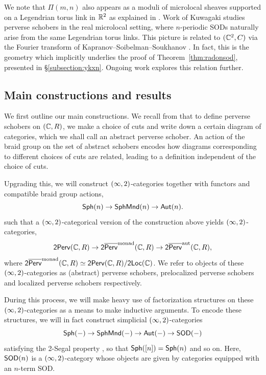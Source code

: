 We note that $\Pi(m,n)$ also appears as a moduli of microlocal sheaves supported on a Legendrian torus link in $\mathbb{R}^2$ as explained in \cite{shendeClusterVarietiesLegendrian2019}. Work of Kuwagaki \cite{kuwagakiCategorificationLegendrianKnots2019} studies perverse schobers in the real microlocal setting, where $n$-periodic SODs naturally arise from the same Legendrian torus links. This picture is related to $(\mathbb{C}^2,C)$ via the Fourier transform of Kapranov--Soibelman--Soukhanov \cite{kapranovPerverseSchobersAlgebra2020}. In fact, this is the geometry which implicitly underlies the proof of Theorem~\ref{thm:radonsod}, presented in \S\ref{subsection:ykxn}. Ongoing work explores this relation further.

\subsection{Main constructions and results}
We first outline our main constructions. We recall from \cite{kapranovPerverseSchobers2015} that to define perverse schobers on $(\mathbb{C},R)$, we make a choice of cuts and write down a certain diagram of categories, which we shall call an abstract perverse schober. An action of the braid group on the set of abstract schobers encodes how diagrams corresponding to different choices of cuts are related, leading to a definition independent of the choice of cuts.

Upgrading this, we will construct $(\infty,2)$-categories together with functors and compatible braid group actions,
\[\mathsf{Sph}(n)\to\mathsf{SphMnd}(n)\to\mathsf{Aut}(n).\]
such that a $(\infty,2)$-categorical version of the construction above yields $(\infty,2)$-categories,
\[\mathsf{2Perv}(\mathbb{C},R)\to \mathsf{2}\overline{\mathsf{Perv}}^{\operatorname{monad}}(\mathbb{C},R)\to\mathsf{2}\overline{\mathsf{Perv}}^{\operatorname{aut}}(\mathbb{C},R),\]
where $\mathsf{2}\overline{\mathsf{Perv}}^{\operatorname{monad}}(\mathbb{C},R)\simeq \mathsf{2Perv}(\mathbb{C},R)/\mathsf{2Loc}(\mathbb{C})$. We refer to objects of these $(\infty,2)$-categories as (abstract) perverse schobers, prelocalized perverse schobers and localized perverse schobers respectively.

During this process, we will make heavy use of factorization structures on these $(\infty,2)$-categories as a means to make inductive arguments. To encode these structures, we will in fact construct simplicial $(\infty,2)$-categories
\[\mathsf{Sph}(-)\to\mathsf{SphMnd}(-)\to\mathsf{Aut}(-)\to \mathsf{SOD}(-)\]
satisfying the 2-Segal property \cites{dyckerhoffHigherSegalSpaces2019,galvez-carrilloDecompositionSpacesIncidence2018}, so that $\mathsf{Sph}([n]) = \mathsf{Sph}(n)$ and so on. Here, $\mathsf{SOD}(n)$ is a $(\infty,2)$-category whose objects are given by categories equipped with an $n$-term SOD. 

